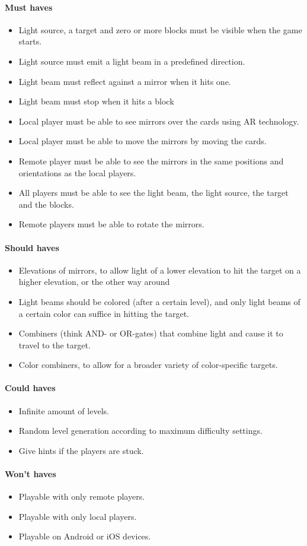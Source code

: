 \paragraph{Must haves}
\begin{itemize}
	\item Light source, a target and zero or more blocks must be visible when the game starts.
	\item Light source must emit a light beam in a predefined direction.
	\item Light beam must reflect against a mirror when it hits one.
	\item Light beam must stop when it hits a block
	\item Local player must be able to see mirrors over the cards using AR technology.
	\item Local player must be able to move the mirrors by moving the cards.
	\item Remote player must be able to see the mirrors in the same positions and 
		  orientations as the local players.
	\item All players must be able to see the light beam, the light source, the target and the blocks.
	\item Remote players must be able to rotate the mirrors.
\end{itemize}

\paragraph{Should haves}
\begin{itemize}
	\item Elevations of mirrors, to allow light of a lower elevation to hit the target on a higher elevation, or the other way around
	\item Light beams should be colored (after a certain level), and only light beams of a certain color can suffice in hitting the target.
	\item Combiners (think AND- or OR-gates) that combine light and cause it to travel to the target.
	\item Color combiners, to allow for a broader variety of color-specific targets.
\end{itemize}

\paragraph{Could haves}
\begin{itemize}
	\item Infinite amount of levels.
	\item Random level generation according to maximum difficulty settings.
	\item Give hints if the players are stuck.
\end{itemize}

\paragraph{Won't haves}
\begin{itemize}
	\item Playable with only remote players.
	\item Playable with only local players.
	\item Playable on Android or iOS devices.
\end{itemize}
